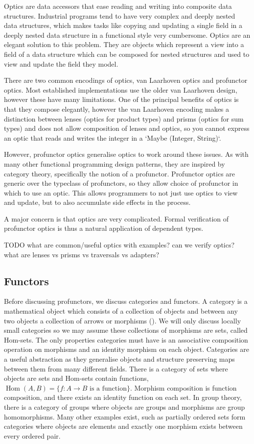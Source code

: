 \documentclass[]{report}
\begin{document}
Optics are data accessors that ease reading and writing into composite data structures. Industrial programs tend to have very complex and deeply nested data structures, which makes tasks like copying and updating a single field in a deeply nested data structure in a functional style very cumbersome. Optics are an elegant solution to this problem. They are objects which represent a view into a field of a data structure which can be composed for nested structures and used to view and update the field they model.

There are two common encodings of optics, van Laarhoven optics and profunctor optics. Most established implementations use the older van Laarhoven design, however these have many limitations. One of the principal benefits of optics is that they compose elegantly, however the van Laarhoven encoding makes a distinction between lenses (optics for product types) and prisms (optics for sum types) and does not allow composition of lenses and optics, so you cannot express an optic that reads and writes the integer in a `Maybe (Integer, String)`.

However, profunctor optics generalise optics to work around these issues. As with many other functional programming design patterns, they are inspired by category theory, specifically the notion of a profunctor. Profunctor optics are generic over the typeclass of profunctors, so they allow choice of profunctor in which to use an optic. This allows programmers to not just use optics to view and update, but to also accumulate side effects in the process.

A major concern is that optics are very complicated. Formal verification of profunctor optics is thus a natural application of dependent types.

TODO
what are common/useful optics with examples?
can we verify optics?
what are lenses vs prisms vs traversals vs adapters?

\subsection{Functors}

Before discussing profunctors, we discuss categories and functors. A category is a mathematical object which consists of a collection of objects and between any two objects a collection of arrows or morphisms (\cite{mac1970categories}). We will only discuss locally small categories so we may assume these collections of morphisms are sets, called Hom-sets. The only properties categories must have is an associative composition operation on morphisms and an identity morphism on each object. Categories are a useful abstraction as they generalise objects and structure preserving maps between them from many different fields. There is a category of sets where objects are sets and Hom-sets contain functions, $\operatorname{Hom}(A,B)=\{ f : A\to B\text{ is a function} \}$. Morphism composition is function composition, and there exists an identity function on each set. In group theory, there is a category of groups where objects are groups and morphisms are group homomorphisms. Many other examples exist, such as partially ordered sets form categories where objects are elements and exactly one morphism exists between every ordered pair.
\end{document}
